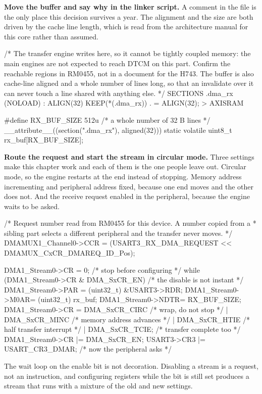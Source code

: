 \begin{steps}
\item \textbf{Move the buffer and say why in the linker script.} A comment in
the file is the only place this decision survives a year. The alignment and the
size are both driven by the cache line length, which is read from the
architecture manual for this core rather than assumed.
\begin{ldcode}
/* The transfer engine writes here, so it cannot be tightly coupled memory:
   the main engines are not expected to reach DTCM on this part. Confirm the
   reachable regions in RM0455, not in a document for the H743. The buffer is
   also cache-line aligned and a whole number of lines long, so that an
   invalidate over it can never touch a line shared with anything else. */
SECTIONS
{
  .dma_rx (NOLOAD) : ALIGN(32) { KEEP(*(.dma_rx)) . = ALIGN(32); } > AXISRAM
}
\end{ldcode}
\begin{ccode}
#define RX_BUF_SIZE 512u                    /* a whole number of 32 B lines */
__attribute__((section(".dma_rx"), aligned(32)))
static volatile uint8_t rx_buf[RX_BUF_SIZE];
\end{ccode}

\item \textbf{Route the request and start the stream in circular mode.} Three
settings make this chapter work and each of them is the one people leave out.
Circular mode, so the engine restarts at the end instead of stopping. Memory
address incrementing and peripheral address fixed, because one end moves and the
other does not. And the receive request enabled in the peripheral, because the
engine waits to be asked.
\begin{ccode}
/* Request number read from RM0455 for this device. A number copied from a
 * sibling part selects a different peripheral and the transfer never moves. */
DMAMUX1_Channel0->CCR = (USART3_RX_DMA_REQUEST << DMAMUX_CxCR_DMAREQ_ID_Pos);

DMA1_Stream0->CR  = 0;                       /* stop before configuring    */
while (DMA1_Stream0->CR & DMA_SxCR_EN) { }   /* the disable is not instant */
DMA1_Stream0->PAR = (uint32_t) &USART3->RDR;
DMA1_Stream0->M0AR= (uint32_t) rx_buf;
DMA1_Stream0->NDTR= RX_BUF_SIZE;
DMA1_Stream0->CR  = DMA_SxCR_CIRC            /* wrap, do not stop          */
                  | DMA_SxCR_MINC            /* memory address advances    */
                  | DMA_SxCR_HTIE            /* half transfer interrupt    */
                  | DMA_SxCR_TCIE;           /* transfer complete too      */
DMA1_Stream0->CR |= DMA_SxCR_EN;
USART3->CR3 |= USART_CR3_DMAR;               /* now the peripheral asks    */
\end{ccode}
The wait loop on the enable bit is not decoration. Disabling a stream is a
request, not an instruction, and configuring registers while the bit is still
set produces a stream that runs with a mixture of the old and new settings.


\end{steps}
